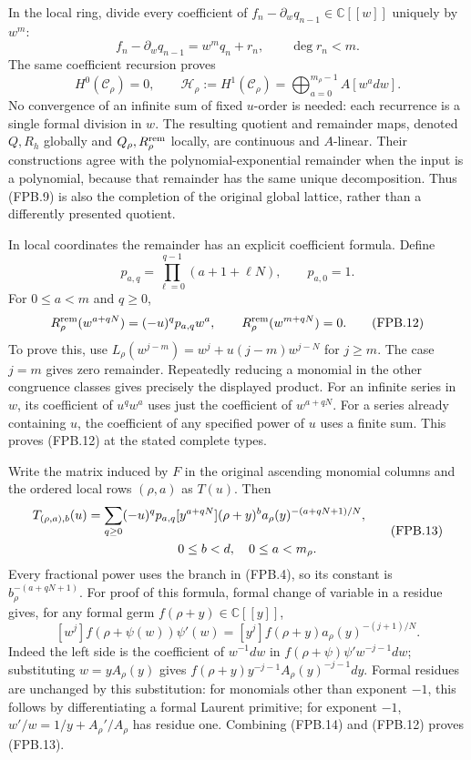 In the local ring, divide every coefficient of
\(f_n-\partial_wq_{n-1}\in\mathbb C[[w]]\) uniquely by \(w^m\):
\[
 f_n-\partial_wq_{n-1}=w^m q_n+r_n,
 \qquad \deg r_n<m.
 \tag{FPB.10}\label{eq:fpb-local-division}
\]
The same coefficient recursion proves
\[
 H^0(\mathcal C_\rho)=0,
 \qquad \mathcal H_\rho:=H^1(\mathcal C_\rho)
       =\bigoplus_{a=0}^{m_\rho-1}A[w^a dw].
 \tag{FPB.11}\label{eq:fpb-local-remainder}
\]
No convergence of an infinite sum of fixed \(u\)-order is needed:
each recurrence is a single formal division in \(w\). The resulting
quotient and remainder maps, denoted \(Q,R_h\) globally and
\(Q_\rho,R_\rho^{\rm rem}\) locally, are continuous and \(A\)-linear.
Their constructions agree with the polynomial-exponential remainder
when the input is a polynomial, because that remainder has the same
unique decomposition. Thus (FPB.9) is also the completion of the
original global lattice, rather than a differently presented quotient.

In local coordinates the remainder has an explicit coefficient
formula. Define
\[
 p_{a,q}=\prod_{\ell=0}^{q-1}(a+1+\ell N),\qquad p_{a,0}=1.
\]
For \(0\le a<m\) and \(q\ge0\),
\[
 R_\rho^{\rm rem}(w^{a+qN})=(-u)^q p_{a,q}w^a,
 \qquad
 R_\rho^{\rm rem}(w^{m+qN})=0.
 \tag{FPB.12}\label{eq:fpb-monomial-remainder}
\]
To prove this, use
\(L_\rho(w^{j-m})=w^j+u(j-m)w^{j-N}\) for \(j\ge m\).
The case \(j=m\) gives zero remainder. Repeatedly reducing a monomial
in the other congruence classes gives precisely the displayed product.
For an infinite series in \(w\), its coefficient of \(u^q w^a\)
uses just the coefficient of \(w^{a+qN}\). For a series already
containing \(u\), the coefficient of any specified power of \(u\)
uses a finite sum. This proves (FPB.12) at the stated complete types.

Write the matrix induced by \(F\) in the original ascending monomial
columns and the ordered local rows \((\rho,a)\) as \(T(u)\). Then
\[
 \begin{split}
 T_{(\rho,a),b}(u)
 &=\sum_{q\ge0}(-u)^q p_{a,q}
   [y^{a+qN}](\rho+y)^b
       a_\rho(y)^{-(a+qN+1)/N},\\
 &\hspace{25mm}0\le b<d,\quad 0\le a<m_\rho.
 \end{split}
 \tag{FPB.13}\label{eq:fpb-T}
\]
Every fractional power uses the branch in (FPB.4), so its constant
is \(b_\rho^{-(a+qN+1)}\). For proof of this formula, formal
change of variable in a residue gives, for any formal germ
\(f(\rho+y)\in\mathbb C[[y]]\),
\[
 [w^j]f(\rho+\psi(w))\psi'(w)
   =[y^j]f(\rho+y)a_\rho(y)^{-(j+1)/N}.
 \tag{FPB.14}\label{eq:fpb-residue}
\]
Indeed the left side is the coefficient of \(w^{-1}dw\) in
\(f(\rho+\psi)\psi' w^{-j-1}dw\); substituting
\(w=yA_\rho(y)\) gives
\(f(\rho+y)y^{-j-1}A_\rho(y)^{-j-1}dy\). Formal residues are
unchanged by this substitution: for monomials other than exponent
\(-1\), this follows by differentiating a formal Laurent primitive;
for exponent \(-1\), \(w'/w=1/y+A_\rho'/A_\rho\) has residue one.
Combining (FPB.14) and (FPB.12) proves (FPB.13).

